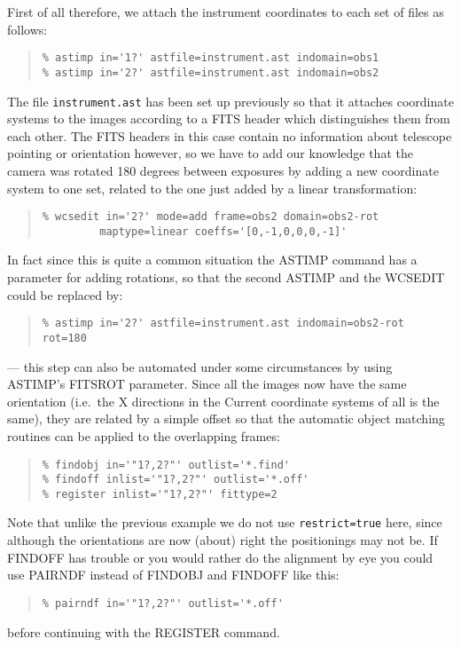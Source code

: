 \documentclass[twoside,11pt]{article}
\newcommand{\htmlref}[2]{#1}
\renewcommand{\_}{\texttt{\symbol{95}}}
\newenvironment{myquote}{\begin{quote}\begin{small}}{\end{small}\end{quote}}
\newcommand{\text}[1]{{\small \tt #1}}
\newcommand{\routine}[1]{{\sc #1}}
\newcommand{\xroutine}[1]{\htmlref{{\sc #1}}{#1}}
\begin{document}
First of all therefore, we attach the instrument coordinates
to each set of files as follows:
\begin{myquote}
\begin{verbatim}
% astimp in='1?' astfile=instrument.ast indomain=obs1 
% astimp in='2?' astfile=instrument.ast indomain=obs2
\end{verbatim}
\end{myquote}
The file \text{instrument.ast} has been set up previously so that
it attaches coordinate systems to the images according to 
a FITS header which distinguishes them from each other.
The FITS headers in this case contain no information about 
telescope pointing or orientation however, so we have to add
our knowledge that the camera was rotated 180 degrees between
exposures by adding a new coordinate system to one set, 
related to the one just added by a linear transformation:
\begin{myquote}
\begin{verbatim}
% wcsedit in='2?' mode=add frame=obs2 domain=obs2-rot 
         maptype=linear coeffs='[0,-1,0,0,0,-1]'
\end{verbatim}
\end{myquote}
In fact since this is quite a common situation the \xroutine{ASTIMP}
command has a parameter for adding rotations, so that the second
ASTIMP and the WCSEDIT could be replaced by:
\begin{myquote}
\begin{verbatim}
% astimp in='2?' astfile=instrument.ast indomain=obs2-rot rot=180
\end{verbatim}
\end{myquote}
--- this step can also be automated under some circumstances by using 
\routine{ASTIMP}'s FITSROT parameter.
Since all the images now have the same orientation 
(i.e.\ the X directions in the Current coordinate systems of all is the same), 
they are related
by a simple offset so that the automatic object matching routines
can be applied to the overlapping frames:
\begin{myquote}
\begin{verbatim}
% findobj in='"1?,2?"' outlist='*.find'
% findoff inlist='"1?,2?"' outlist='*.off'
% register inlist='"1?,2?"' fittype=2
\end{verbatim}
\end{myquote}
Note that unlike the previous example we do not use {\tt restrict=true} here,
since although the orientations are now (about) right 
the positionings may not be.
If \routine{FINDOFF} has trouble or you would rather do the alignment
by eye you could use \xroutine{PAIRNDF} instead of 
\routine{FINDOBJ} and \routine{FINDOFF} like this:
\begin{myquote}
\begin{verbatim}
% pairndf in='"1?,2?"' outlist='*.off'
\end{verbatim}
\end{myquote}
before continuing with the \routine{REGISTER} command.
\end{document}
